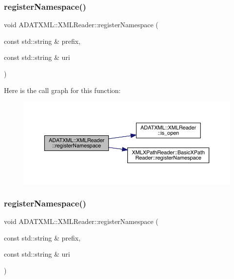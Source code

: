 \subsubsection{\texorpdfstring{registerNamespace()}{registerNamespace()}\hspace{0.1cm}{\footnotesize\ttfamily [2/3]}}
{\footnotesize\ttfamily void A\+D\+A\+T\+X\+M\+L\+::\+X\+M\+L\+Reader\+::register\+Namespace (\begin{DoxyParamCaption}\item[{const std\+::string \&}]{prefix,  }\item[{const std\+::string \&}]{uri }\end{DoxyParamCaption})\hspace{0.3cm}{\ttfamily [inline]}}

Here is the call graph for this function\+:
\nopagebreak
\begin{figure}[H]
\begin{center}
\leavevmode
\includegraphics[width=350pt]{db/d3f/classADATXML_1_1XMLReader_aeb735523fc1858850ae8a2be61a34189_cgraph}
\end{center}
\end{figure}
\mbox{\label{classADATXML_1_1XMLReader_aeb735523fc1858850ae8a2be61a34189}} 
\subsubsection{\texorpdfstring{registerNamespace()}{registerNamespace()}\hspace{0.1cm}{\footnotesize\ttfamily [3/3]}}
{\footnotesize\ttfamily void A\+D\+A\+T\+X\+M\+L\+::\+X\+M\+L\+Reader\+::register\+Namespace (\begin{DoxyParamCaption}\item[{const std\+::string \&}]{prefix,  }\item[{const std\+::string \&}]{uri }\end{DoxyParamCaption})\hspace{0.3cm}{\ttfamily [inline]}}

